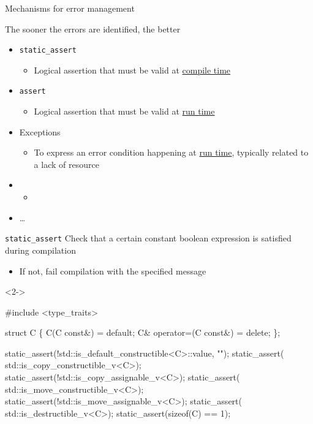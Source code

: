 \begin{frame}{Mechanisms for error management}

  \centering\alert{The sooner the errors are identified, the better}

  \begin{itemize}
  \item \texttt{static\_assert}
    \begin{itemize}
    \item Logical assertion that must be valid at \underline{compile time}
    \end{itemize}
  \item \texttt{assert}
    \begin{itemize}
    \item Logical assertion that must be valid at \underline{run time}
    \end{itemize}
  \item Exceptions
    \begin{itemize}
    \item To express an error condition happening at \underline{run time},
      typically related to a lack of resource
    \end{itemize}
    \item \color[rgb]{.6,.6,.6}{C-style error codes}
      \begin{itemize}
      \item \color[rgb]{.6,.6,.6}{They can be ignored (but they should not!)}
      \end{itemize}
    \item \ldots
  \end{itemize}
\end{frame}

\begin{frame}[fragile]{\texttt{static\_assert}}
  Check that a certain constant boolean expression is satisfied during
  compilation
  \begin{itemize}
  \item If not, fail compilation with the specified message
  \end{itemize}

  \begin{codeblock}<2->{
#include <type\_traits>

struct C \{
  C(C const\&) = default;
  C\& operator=(C const\&) = delete;
\};

\alert<2-3>{static\_assert(!std::is\_default\_constructible<C>::value, "");
static\_assert( std::is\_copy\_constructible\_v<C>);
static\_assert(!std::is\_copy\_assignable\_v<C>);
static\_assert( std::is\_move\_constructible\_v<C>);
static\_assert(!std::is\_move\_assignable\_v<C>);
static\_assert( std::is\_destructible\_v<C>);
static\_assert(sizeof(C) == 1);}}\end{codeblock}

\end{frame}

